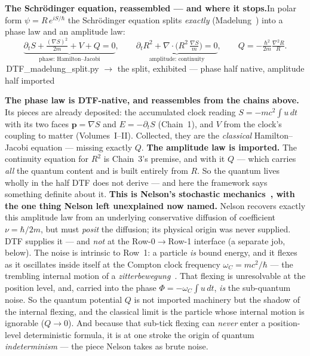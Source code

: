 \documentclass[11pt]{article}
\newcommand{\pychip}[2]{{\footnotesize\colorbox{cbPyBg}{\ttfamily\,#1\,}\,{\color{gray}$\to$ #2}}}
\begin{document}
\textbf{The Schr\"odinger equation, reassembled --- and where it stops.}\enspace In polar form
$\psi=R\,e^{iS/\hbar}$ the Schr\"odinger equation splits \emph{exactly} (Madelung~\cite{Madelung1927}) into
a phase law and an amplitude law:
\[
  \underbrace{\partial_t S+\tfrac{(\nabla S)^2}{2m}+V+Q=0}_{\text{phase: Hamilton--Jacobi}},
  \qquad
  \underbrace{\partial_t R^2+\nabla\!\cdot\!\Big(R^2\,\tfrac{\nabla S}{m}\Big)=0}_{\text{amplitude: continuity}},
  \qquad Q=-\tfrac{\hbar^2}{2m}\tfrac{\nabla^2 R}{R}.
\]
\pychip{DTF\_madelung\_split.py}{the split, exhibited --- phase half native, amplitude half imported}
\par\smallskip
\textbf{The phase law is DTF-native, and reassembles from the chains above.} Its pieces are already
deposited: the accumulated clock reading $S=-mc^2\!\int u\,dt$ with its two faces $\mathbf p=\nabla S$ and
$E=-\partial_t S$ (Chain~1), and $V$ from the clock's coupling to matter (Volumes~I--II). Collected, they
are the \emph{classical} Hamilton--Jacobi equation --- missing exactly $Q$.
\textbf{The amplitude law is imported.} The continuity equation for $R^2$ is Chain~3's premise, and with it
$Q$ --- which carries \emph{all} the quantum content and is built entirely from $R$. So the quantum lives
wholly in the half DTF does not derive --- and here the framework says something definite about it.
\textbf{This is Nelson's stochastic mechanics~\cite{Nelson1966}, with the one thing Nelson left unexplained
now named.} Nelson recovers exactly this amplitude law from an underlying conservative diffusion of
coefficient $\nu=\hbar/2m$, but must \emph{posit} the diffusion; its physical origin was never supplied.
DTF supplies it --- and \emph{not} at the Row-0$\to$Row-1 interface (a separate job, below). The noise is
intrinsic to Row~1: a particle \emph{is} bound energy, and it
flexes as it oscillates inside itself at the Compton clock frequency $\omega_C=mc^2/\hbar$ --- the trembling
internal motion of a \emph{zitterbewegung}~\cite{Schrodinger1930,Hestenes1990}. That flexing is unresolvable
at the position level, and, carried into the phase $\Phi=-\omega_C\!\int u\,dt$, \emph{is} the sub-quantum
noise. So the quantum potential $Q$ is not imported machinery but the shadow of the internal flexing, and
the classical limit is the particle whose internal motion is ignorable ($Q\to0$). And because that sub-tick
flexing can \emph{never} enter a position-level deterministic formula, it is at one stroke the origin of
quantum \emph{indeterminism} --- the piece Nelson takes as brute noise.
\par\smallskip
\end{document}
